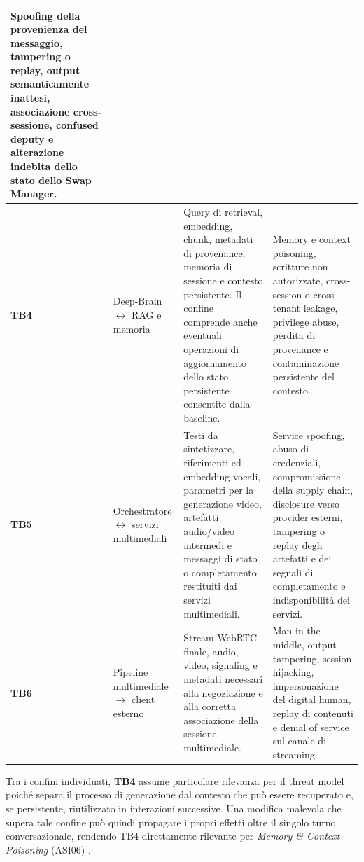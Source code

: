 \documentclass[11pt,a4paper]{article}
\begin{document}
\begin{longtable}{
|C{0.9cm}|
L{3.0cm}|
L{4.8cm}|
L{\dimexpr\textwidth-0.9cm-3.0cm-4.8cm-8\arrayrulewidth\relax}|
}
Spoofing della provenienza del messaggio, tampering o replay,
output semanticamente inattesi, associazione cross-sessione,
confused deputy e alterazione indebita dello stato dello
Swap Manager.
\\
\hline


\textbf{TB4} &
Deep-Brain $\leftrightarrow$ RAG e memoria &

Query di retrieval, embedding, chunk, metadati di provenance,
memoria di sessione e contesto persistente. Il confine comprende
anche eventuali operazioni di aggiornamento dello stato persistente
consentite dalla baseline. &

Memory e context poisoning, scritture non autorizzate,
cross-session o cross-tenant leakage, privilege abuse,
perdita di provenance e contaminazione persistente del contesto.
\\
\hline


\textbf{TB5} &
Orchestratore $\leftrightarrow$ servizi multimediali &

Testi da sintetizzare, riferimenti ed embedding vocali,
parametri per la generazione video, artefatti audio/video
intermedi e messaggi di stato o completamento restituiti dai
servizi multimediali. &

Service spoofing, abuso di credenziali, compromissione della
supply chain, disclosure verso provider esterni, tampering o replay
degli artefatti e dei segnali di completamento e indisponibilità
dei servizi.
\\
\hline


\textbf{TB6} &
Pipeline multimediale $\rightarrow$ client esterno &

Stream WebRTC finale, audio, video, signaling e metadati necessari
alla negoziazione e alla corretta associazione della sessione
multimediale. &

Man-in-the-middle, output tampering, session hijacking,
impersonazione del digital human, replay di contenuti e
denial of service sul canale di streaming.
\\
\hline

\end{longtable}

\endgroup


Tra i confini individuati, \textbf{TB4} assume particolare rilevanza
per il threat model poiché separa il processo di generazione dal
contesto che può essere recuperato e, se persistente, riutilizzato in
interazioni successive. Una modifica malevola che supera tale confine
può quindi propagare i propri effetti oltre il singolo turno
conversazionale, rendendo TB4 direttamente rilevante per
\emph{Memory \& Context Poisoning} (ASI06)
\cite{owaspagentic}.
\end{document}

